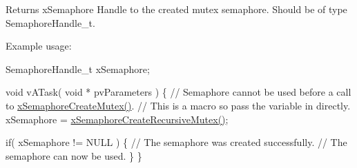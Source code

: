 \begin{DoxyReturn}{Returns}
x\+Semaphore Handle to the created mutex semaphore. Should be of type Semaphore\+Handle\+\_\+t.
\end{DoxyReturn}
Example usage\+: 
\begin{DoxyPre}
SemaphoreHandle\_t xSemaphore;\end{DoxyPre}



\begin{DoxyPre}void vATask( void * pvParameters )
\{
   // Semaphore cannot be used before a call to \hyperlink{semphr_8h_aa6a00aa9b91a9e5b3ebe4ae1c3f115c6}{xSemaphoreCreateMutex()}.
   // This is a macro so pass the variable in directly.
   xSemaphore = \hyperlink{semphr_8h_a1bbc843be5a41ea83d2693b2189fc0f8}{xSemaphoreCreateRecursiveMutex()};\end{DoxyPre}



\begin{DoxyPre}   if( xSemaphore != NULL )
   \{
       // The semaphore was created successfully.
       // The semaphore can now be used.
   \}
\}
\end{DoxyPre}
 